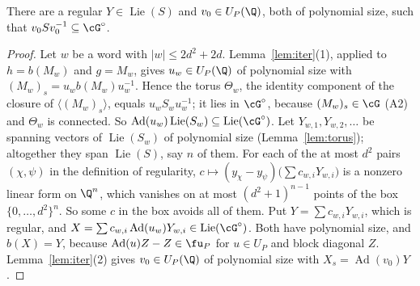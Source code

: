 \begin{lemma}\label{lem:v0}
There are a regular $Y\in\operatorname{Lie}(S)$ and $v_0\in U_P(\Q)$, both of polynomial size, such that
$v_0Sv_0^{-1}\subseteq\cG^\circ$.
\end{lemma}
\begin{proof}
Let $w$ be a word with $|w|\le2d^2+2d$. Lemma~\ref{lem:iter}(1), applied to $h=b(M_w)$ and $g=M_w$,
gives $u_w\in U_P(\Q)$ of polynomial size with $(M_w)_s=u_wb(M_w)u_w^{-1}$. Hence the torus
$\Theta_w$, the identity component of the closure of $\langle(M_w)_s\rangle$, equals $u_wS_wu_w^{-1}$;
it lies in $\cG^\circ$, because $(M_w)_s\in\cG$ (A2) and $\Theta_w$ is connected. So
$\operatorname{Ad}(u_w)\operatorname{Lie}(S_w)\subseteq\operatorname{Lie}(\cG^\circ)$. Let $Y_{w,1},Y_{w,2},\ldots$ be spanning vectors of
$\operatorname{Lie}(S_w)$ of polynomial size (Lemma~\ref{lem:torus}); altogether they span $\operatorname{Lie}(S)$, say $n$ of
them. For each of the at most $d^2$ pairs $(\chi,\psi)$ in the definition of regularity,
$c\mapsto(y_\chi-y_\psi)\bigl(\sum c_{w,i}Y_{w,i}\bigr)$ is a nonzero linear form on $\Q^n$, which
vanishes on at most $(d^2+1)^{n-1}$ points of the box $\{0,\ldots,d^2\}^n$. So some $c$ in the box
avoids all of them. Put $Y=\sum c_{w,i}Y_{w,i}$, which is regular, and
$X=\sum c_{w,i}\operatorname{Ad}(u_w)Y_{w,i}\in\operatorname{Lie}(\cG^\circ)$. Both have polynomial size, and $b(X)=Y$, because
$\operatorname{Ad}(u)Z-Z\in\fu_P$ for $u\in U_P$ and block diagonal $Z$. Lemma~\ref{lem:iter}(2) gives
$v_0\in U_P(\Q)$ of polynomial size with $X_s=\operatorname{Ad}(v_0)Y$.


\end{proof}
